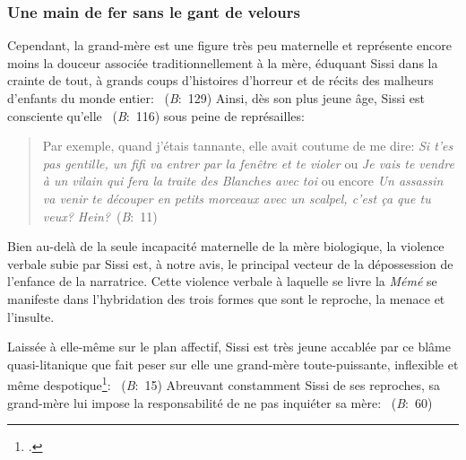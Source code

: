 \subsubsection{Une main de fer sans le gant de velours}
Cependant, la grand-mère est une figure très peu maternelle et représente encore moins la douceur associée traditionnellement à la mère, éduquant Sissi dans la crainte de tout, à grands coups d'histoires d'horreur et de récits des malheurs d'enfants du monde entier: ~(\textit{B}:~129)
Ainsi, dès son plus jeune âge, Sissi est consciente qu'elle ~(\textit{B}:~116) sous peine de représailles:
\begin{quote}
  \begin{singlespace}
    \small
    Par exemple, quand j'étais tannante, elle avait coutume de me dire: \textit{Si t'es pas gentille, un fifi va entrer par la fenêtre et te violer} ou \textit{Je vais te vendre à un vilain qui fera la traite des Blanches avec toi} ou encore \textit{Un assassin va venir te découper en petits morceaux avec un scalpel, c'est ça que tu veux? Hein?}~(\textit{B}:~11)
    \normalsize
  \end{singlespace}
\end{quote}
Bien au-delà de la seule incapacité maternelle de la mère biologique, la violence verbale subie par Sissi est, à notre avis, le principal vecteur de la dépossession de l'enfance de la narratrice. Cette violence verbale à laquelle se livre la \textit{Mémé} se manifeste dans l'hybridation des trois formes que sont le reproche, la menace et l'insulte.
\par
Laissée à elle-même sur le plan affectif, Sissi est très jeune accablée par ce blâme quasi-litanique que fait peser sur elle une grand-mère toute-puissante, inflexible et même despotique\footcite[34]{Leduc2010}: ~(\textit{B}:~15)
Abreuvant constamment Sissi de ses reproches, sa grand-mère lui impose la responsabilité de ne pas inquiéter sa mère: ~(\textit{B}:~60)
